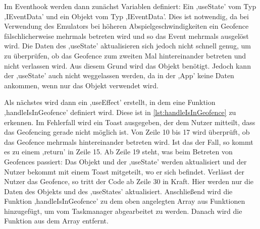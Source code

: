Im Eventhook werden dann zunächst Variablen definiert: Ein ,useState' vom Typ ,IEventData' und ein Objekt vom Typ ,IEventData'. Dies ist notwendig, da bei Verwendung des Emulators bei höheren Abspielgeschwindigkeiten ein Geofence fälschlicherweise mehrmals betreten wird und so das Event mehrmals ausgelöst wird. Die Daten des ,useState' aktualisieren sich jedoch nicht schnell genug, um zu überprüfen, ob das Geofence zum zweiten Mal hintereinander betreten und nicht verlassen wird. Aus diesem Grund wird das Objekt benötigt. Jedoch kann der ,useState' auch nicht weggelassen werden, da in der ,App' keine Daten ankommen, wenn nur das Objekt verwendet wird. 

Als nächstes wird dann ein ,useEffect' erstellt, in dem eine Funktion ,handleIsInGeofence' definiert wird. Diese ist in \autoref{lst:handleIsInGeofence} zu erkennen. Im Fehlerfall wird ein Toast ausgegeben, der dem Nutzer mitteilt, dass das Geofencing gerade nicht möglich ist. Von Zeile 10 bis 17 wird überprüft, ob das Geofence mehrmals hintereinander betreten wird. Ist das der Fall, so kommt es zu einem ,return' in Zeile 15. Ab Zeile 19 steht, was beim Betreten von Geofences passiert: Das Objekt und der ,useState' werden aktualisiert und der Nutzer bekommt mit einem Toast mitgeteilt, wo er sich befindet. Verlässt der Nutzer das Geofence, so tritt der Code ab Zeile 30 in Kraft. Hier werden nur die Daten des Objekts und des ,useStates' aktualisiert. Anschließend wird die Funktion ,handleIsInGeofence' zu dem oben angelegten Array aus Funktionen hinzugefügt, um vom Taskmanager abgearbeitet zu werden. Danach wird die Funktion aus dem Array entfernt.


